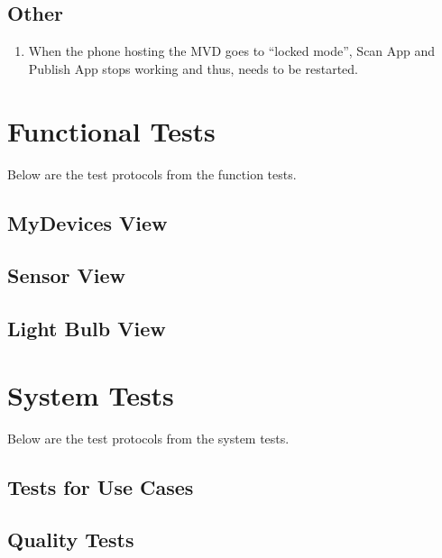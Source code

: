 \documentclass[a4paper]{article}
\begin{document}
\subsection{Other}
\begin{enumerate}
	\item When the phone hosting the MVD goes to “locked mode”, Scan App and Publish App stops working and thus, needs to be restarted.
\end{enumerate}


\clearpage
\section{Functional Tests}
Below are the test protocols from the function tests.

\subsection{MyDevices View}





\subsection{Sensor View}





\subsection{Light Bulb View}




\newpage
\section{System Tests}
Below are the test protocols from the system tests.

\subsection{Tests for Use Cases}




\subsection{Quality Tests}



\end{document}
